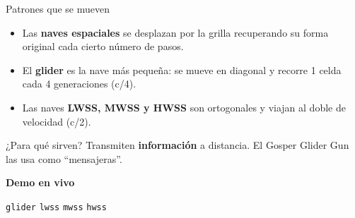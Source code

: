 \documentclass[10pt,aspectratio=169]{beamer}
\newcommand{\demo}[1]{\textcolor{democolor}{\texttt{#1}}}
\begin{document}
\begin{frame}{Patrones que se mueven}

  \vspace{0.4cm}

  \begin{itemize}
    \item Las \textbf{naves espaciales} se desplazan por la grilla
          recuperando su forma original cada cierto número de pasos.
    \item El \textbf{glider} es la nave más pequeña: se mueve en diagonal
          y recorre 1 celda cada 4 generaciones (c/4).
    \item Las naves \textbf{LWSS, MWSS y HWSS} son ortogonales y viajan
          al doble de velocidad (c/2).
  \end{itemize}

  \begin{block}{¿Para qué sirven?}
    Transmiten \textbf{información} a distancia.
    El Gosper Glider Gun las usa como ``mensajeras''.
  \end{block}

  \vspace{0.3cm}

  \begin{center}
    \textbf{Demo en vivo}

    \demo{glider} \quad \demo{lwss} \quad \demo{mwss} \quad \demo{hwss}
  \end{center}
\end{frame}
\end{document}
